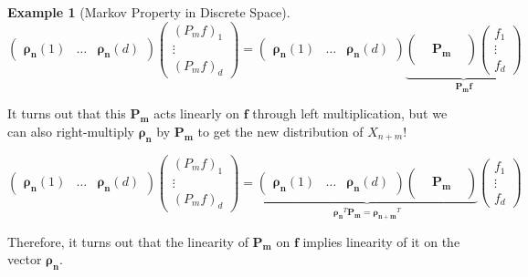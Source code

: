 \documentclass{article}
\theoremstyle{definition}
\newtheorem{example}{Example}[section]
\theoremstyle{remark}
\theoremstyle{definition}
\begin{document}
\begin{example}[Markov Property in Discrete Space]
      \[\begin{pmatrix} \boldsymbol{\rho_n} (1) & \ldots & \boldsymbol{\rho_n} (d) \end{pmatrix} \begin{pmatrix} (P_m f)_1 \\ \vdots \\(P_m f)_d \end{pmatrix} = \begin{pmatrix} \boldsymbol{\rho_n} (1) & \ldots & \boldsymbol{\rho_n} (d) \end{pmatrix} \underbrace{\begin{pmatrix} && \\ & \mathbf{P_m} & \\ && \end{pmatrix} \begin{pmatrix} f_1 \\ \vdots \\ f_d \end{pmatrix}}_{\mathbf{P_m f}}\]

    It turns out that this $\mathbf{P_m}$ acts linearly on $\mathbf{f}$ through left multiplication, but we can also right-multiply $\boldsymbol{\rho_n}$ by $\mathbf{P_m}$ to get the new distribution of $X_{n + m}$! 

      \[\begin{pmatrix} \boldsymbol{\rho_n} (1) & \ldots & \boldsymbol{\rho_n} (d) \end{pmatrix} \begin{pmatrix} (P_m f)_1 \\ \vdots \\(P_m f)_d \end{pmatrix} = \underbrace{\begin{pmatrix} \boldsymbol{\rho_n} (1) & \ldots & \boldsymbol{\rho_n} (d) \end{pmatrix} \begin{pmatrix} && \\ & \mathbf{P_m} & \\ && \end{pmatrix}}_{\boldsymbol{\rho_n}^T \mathbf{P_m} = \boldsymbol{\rho_{n+m}}^T} \begin{pmatrix} f_1 \\ \vdots \\ f_d \end{pmatrix}\]

    Therefore, it turns out that the linearity of $\mathbf{P_m}$ on $\mathbf{f}$ implies linearity of it on the vector $\boldsymbol{\rho_n}$. 
  \end{example}
\end{document}
